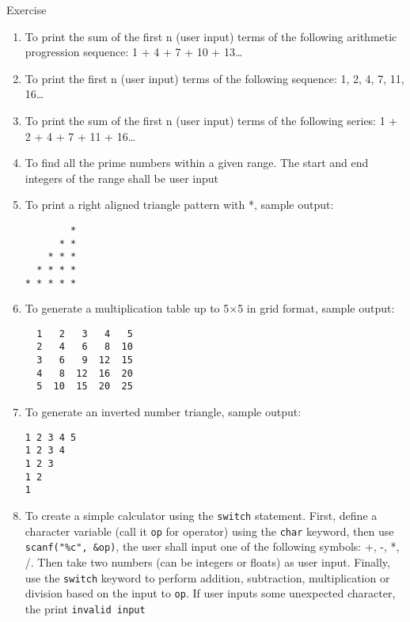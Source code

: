 \documentclass[12pt, aspectratio=169]{beamer}
\begin{document}
\begin{frame}{Exercise}
\begin{enumerate}
            \item To print the sum of the first n (user input) terms of the following arithmetic progression sequence: 1 + 4 + 7 + 10 + 13\dots
            \item To print the first n (user input) terms of the following sequence: 1, 2, 4, 7, 11, 16\dots
            \item To print the sum of the first n (user input) terms of the following series: 1 + 2 + 4 + 7 + 11 + 16\dots
            \item To find all the prime numbers within a given range. The start and end integers of the range shall be user input
            \item To print a right aligned triangle pattern with *, sample output:
            \begin{verbatim}
        *
      * *
    * * *
  * * * *
* * * * *
            \end{verbatim}

            \framebreak

            \item To generate a multiplication table up to 5×5 in grid format, sample output:
            \begin{verbatim}
  1   2   3   4   5
  2   4   6   8  10
  3   6   9  12  15
  4   8  12  16  20
  5  10  15  20  25
            \end{verbatim}

            \framebreak

            \item To generate an inverted number triangle, sample output:
            \begin{verbatim}
1 2 3 4 5
1 2 3 4
1 2 3
1 2
1
            \end{verbatim}

            \framebreak

            \item To create a simple calculator using the \texttt{switch} statement. First, define a character variable (call it \texttt{op} for operator) using the \texttt{char} keyword, then use \texttt{scanf("\%c", \&op)}, the user shall input one of the following symbols: +, -, *, /. Then take two numbers (can be integers or floats) as user input. Finally, use the \texttt{switch} keyword to perform addition, subtraction, multiplication or division based on the input to \texttt{op}. If user inputs some unexpected character, the print \texttt{invalid input}
        \end{enumerate}
    \end{frame}
\end{document}
